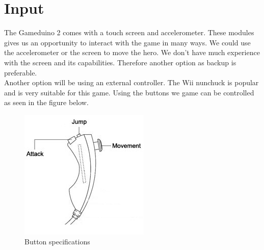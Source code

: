 \section{Input}
The Gameduino 2 comes with a touch screen and accelerometer. These modules gives us an opportunity to interact with the game in many ways. We could use the accelerometer or the screen to move the hero. We don’t have much experience with the screen and its capabilities. Therefore another option as backup is preferable.\\
Another option will be using an external controller. The Wii nunchuck is popular and is very suitable for this game.  Using the buttons we game can be controlled as seen in the figure below.

\begin{figure}[h]
  \centering
  \includegraphics[scale=0.6]{Figures/nunchuk}
  \caption{Button specifications}
\label{fig:Nunchuk}
\end{figure}
